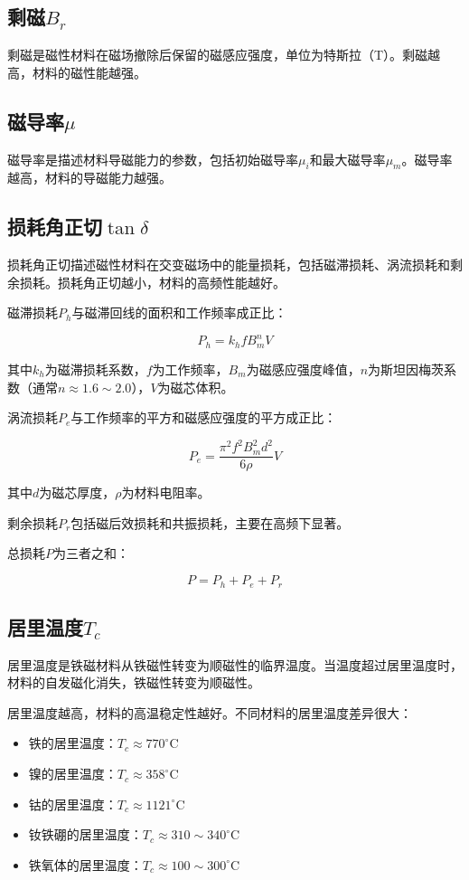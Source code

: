 \documentclass[12pt,UTF8]{ctexbook}
\begin{document}
\subsection{剩磁$B_r$}

剩磁是磁性材料在磁场撤除后保留的磁感应强度，单位为特斯拉（T）。剩磁越高，材料的磁性能越强。

\subsection{磁导率$\mu$}

磁导率是描述材料导磁能力的参数，包括初始磁导率$\mu_i$和最大磁导率$\mu_m$。磁导率越高，材料的导磁能力越强。

\subsection{损耗角正切$\tan\delta$}

损耗角正切描述磁性材料在交变磁场中的能量损耗，包括磁滞损耗、涡流损耗和剩余损耗。损耗角正切越小，材料的高频性能越好。

磁滞损耗$P_h$与磁滞回线的面积和工作频率成正比：

$$ P_h = k_h f B_m^n V $$

其中$k_h$为磁滞损耗系数，$f$为工作频率，$B_m$为磁感应强度峰值，$n$为斯坦因梅茨系数（通常$n \approx 1.6 \sim 2.0$），$V$为磁芯体积。

涡流损耗$P_e$与工作频率的平方和磁感应强度的平方成正比：

$$ P_e = \frac{\pi^2 f^2 B_m^2 d^2}{6\rho} V $$

其中$d$为磁芯厚度，$\rho$为材料电阻率。

剩余损耗$P_r$包括磁后效损耗和共振损耗，主要在高频下显著。

总损耗$P$为三者之和：

$$ P = P_h + P_e + P_r $$

\subsection{居里温度$T_c$}

居里温度是铁磁材料从铁磁性转变为顺磁性的临界温度。当温度超过居里温度时，材料的自发磁化消失，铁磁性转变为顺磁性。

居里温度越高，材料的高温稳定性越好。不同材料的居里温度差异很大：

\begin{itemize}[leftmargin=2cm]
    \item 铁的居里温度：$T_c \approx 770^\circ$C
    \item 镍的居里温度：$T_c \approx 358^\circ$C
    \item 钴的居里温度：$T_c \approx 1121^\circ$C
    \item 钕铁硼的居里温度：$T_c \approx 310 \sim 340^\circ$C
    \item 铁氧体的居里温度：$T_c \approx 100 \sim 300^\circ$C
\end{itemize}
\end{document}
